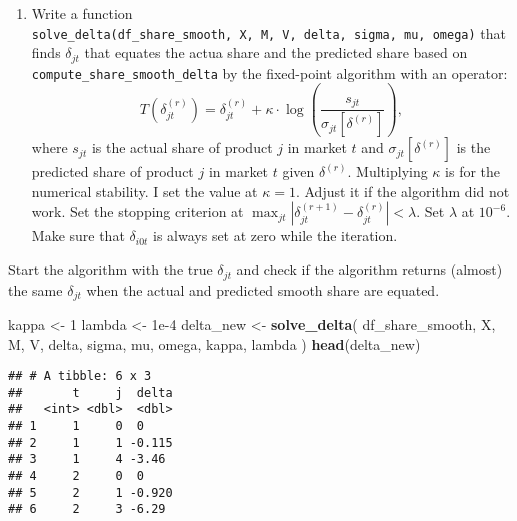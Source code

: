 \documentclass[
]{book}
\newenvironment{Shaded}{\begin{snugshade}}{\end{snugshade}}
\newcommand{\DecValTok}[1]{\textcolor[rgb]{0.00,0.00,0.81}{#1}}
\newcommand{\FloatTok}[1]{\textcolor[rgb]{0.00,0.00,0.81}{#1}}
\newcommand{\FunctionTok}[1]{\textcolor[rgb]{0.13,0.29,0.53}{\textbf{#1}}}
\newcommand{\NormalTok}[1]{#1}
\newcommand{\OtherTok}[1]{\textcolor[rgb]{0.56,0.35,0.01}{#1}}
\newcommand{\SpecialCharTok}[1]{\textcolor[rgb]{0.81,0.36,0.00}{\textbf{#1}}}
\providecommand{\tightlist}{%
  \setlength{\itemsep}{0pt}\setlength{\parskip}{0pt}}
\begin{document}
\begin{enumerate}
\def\labelenumi{\arabic{enumi}.}
\setcounter{enumi}{7}
\tightlist
\item
  Write a function \texttt{solve\_delta(df\_share\_smooth,\ X,\ M,\ V,\ delta,\ sigma,\ mu,\ omega)} that finds \(\delta_{jt}\) that equates the actua share and the predicted share based on \texttt{compute\_share\_smooth\_delta} by the fixed-point algorithm with an operator:
  \[
  T(\delta_{jt}^{(r)}) = \delta_{jt}^{(r)} + \kappa \cdot \log\left(\frac{s_{jt}}{\sigma_{jt}[\delta^{(r)}]}\right),
  \]
  where \(s_{jt}\) is the actual share of product \(j\) in market \(t\) and \(\sigma_{jt}[\delta^{(r)}]\) is the predicted share of product \(j\) in market \(t\) given \(\delta^{(r)}\). Multiplying \(\kappa\) is for the numerical stability. I set the value at \(\kappa = 1\). Adjust it if the algorithm did not work. Set the stopping criterion at \(\max_{jt}|\delta_{jt}^{(r + 1)} - \delta_{jt}^{(r)}| < \lambda\). Set \(\lambda\) at \(10^{-6}\). Make sure that \(\delta_{i0t}\) is always set at zero while the iteration.
\end{enumerate}

Start the algorithm with the true \(\delta_{jt}\) and check if the algorithm returns (almost) the same \(\delta_{jt}\) when the actual and predicted smooth share are equated.

\begin{Shaded}
\begin{Highlighting}[]
\NormalTok{kappa }\OtherTok{\textless{}{-}} \DecValTok{1}
\NormalTok{lambda }\OtherTok{\textless{}{-}} \FloatTok{1e{-}4}
\NormalTok{delta\_new }\OtherTok{\textless{}{-}}
  \FunctionTok{solve\_delta}\NormalTok{(}
\NormalTok{    df\_share\_smooth, }
\NormalTok{    X, }
\NormalTok{    M, }
\NormalTok{    V, }
\NormalTok{    delta, }
\NormalTok{    sigma, }
\NormalTok{    mu, }
\NormalTok{    omega, }
\NormalTok{    kappa, }
\NormalTok{    lambda}
\NormalTok{    )}
\FunctionTok{head}\NormalTok{(delta\_new)}
\end{Highlighting}
\end{Shaded}

\begin{verbatim}
## # A tibble: 6 x 3
##       t     j  delta
##   <int> <dbl>  <dbl>
## 1     1     0  0    
## 2     1     1 -0.115
## 3     1     4 -3.46 
## 4     2     0  0    
## 5     2     1 -0.920
## 6     2     3 -6.29
\end{verbatim}

\begin{Shaded}
\end{Shaded}
\end{document}
